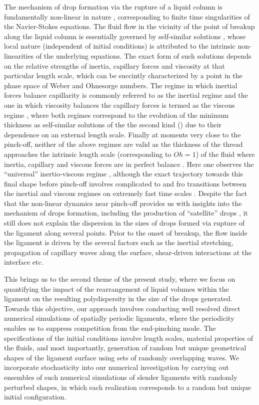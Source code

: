 The mechanism of drop formation via the rupture of a liquid column is 
fundamentally non-linear in nature \cite{eggers2008physics,eggers1995theory}, 
corresponding to finite time singularities of the Navier-Stokes equations.  
The fluid flow in the vicinity of the point of breakup along the liquid column 
is essentially governed by self-similar solutions \cite{eggers1997nonlinear}, whose local nature 
(independent of initial conditions) is attributed to the intrinsic non-linearities of the underlying equations.  
The exact form of such solutions depends on the relative strengths of inertia, 
capillary forces and viscosity at that particular length scale, which can be 
succintly characterized by a point in the phase space of Weber and Ohnesorge numbers.  
The regime in which inertial forces balance capillarity is commonly referred to as
the inertial regime \cite{inertial_1,inertial_2} and the one in which viscosity balances
the capillary forces is termed as the viscous regime \cite{viscous_1,viscous_2}, 
where both regimes correspond to the evolution of the minimum thickness as self-similar solutions 
of the the second kind (\cite{barenblatt}) due to their dependence on an external length scale.
Finally at moments very close to the pinch-off, neither of the above regimes 
are valid as the thickness of the thread approaches the intrinsic length scale (corresponding to $Oh = 1$) 
of the fluid where inertia, capillary and viscous forces are in perfect balance \cite{length_1}.
Here one observes the ``universal'' inertio-viscous regime \cite{length_2}, although the exact 
trajectory towards this final shape before pinch-off involves complicated to and fro transitions 
between the inertial and viscous regimes on extremely fast time scales \cite{plethora}. 
Despite the fact that the non-linear dynamics near pinch-off provides us with insights into
the mechanism of drops formation, including the production of ``satellite'' drops \cite{sat_1, satellite_1, satellite_2},  
it still does not explain the dispersion in the sizes of drops formed via rupture of the ligament along several points. 
Prior to the onset of breakup, the flow inside the ligament is driven by the several factors such as  
the inertial stretching, propagation of capillary waves along the surface, shear-driven interactions at the interface etc.   

This brings us to the second theme of the present study, where we focus on quantifying the impact of the 
rearrangement of liquid volumes within the ligament on the resulting polydispersity in the size of the drops generated. 
Towards this objective, our approach involves conducting well resolved direct numerical simulations of 
spatially periodic ligaments, where the periodicity enables us to suppress competition from the end-pinching mode. 
The specifications of the initial conditions involve length scales, material properties of the fluids, and most importantly,
generation of random but unique geometrical shapes of the ligament surface using sets of randomly overlapping waves.
We incorporate stochasticity into our numerical investigation by carrying out ensembles of such numerical 
simulations of slender ligaments with randomly perturbed shapes, in which each realization corresponds 
to a random but unique initial configuration.

